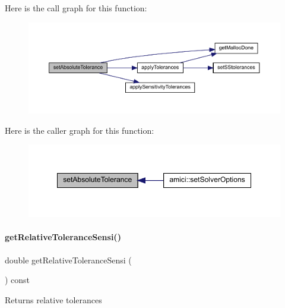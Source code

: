 Here is the call graph for this function\+:
\nopagebreak
\begin{figure}[H]
\begin{center}
\leavevmode
\includegraphics[width=350pt]{classamici_1_1_solver_afe0fd2fad6ce110ad8421f5979945f90_cgraph}
\end{center}
\end{figure}
Here is the caller graph for this function\+:
\nopagebreak
\begin{figure}[H]
\begin{center}
\leavevmode
\includegraphics[width=349pt]{classamici_1_1_solver_afe0fd2fad6ce110ad8421f5979945f90_icgraph}
\end{center}
\end{figure}
\mbox{\label{classamici_1_1_solver_a399bb102a2481c2c4c421d700dd2f0a2}} 
\paragraph{\texorpdfstring{get\+Relative\+Tolerance\+Sensi()}{getRelativeToleranceSensi()}}
{\footnotesize\ttfamily double get\+Relative\+Tolerance\+Sensi (\begin{DoxyParamCaption}{ }\end{DoxyParamCaption}) const}

\begin{DoxyReturn}{Returns}
relative tolerances 
\end{DoxyReturn}


